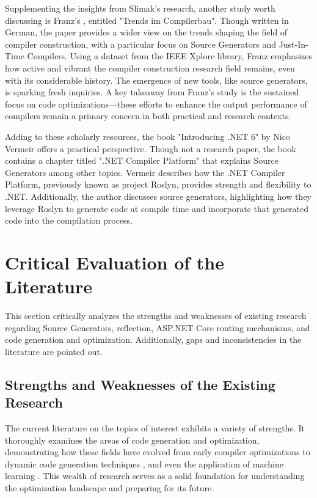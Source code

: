 Supplementing the insights from Slimak's research, another study worth discussing is Franz's \cite{Franz2022}, entitled "Trends im Compilerbau". Though written in German, the paper provides a wider view on the trends shaping the field of compiler construction, with a particular focus on Source Generators and Just-In-Time Compilers. Using a dataset from the IEEE Xplore library, Franz emphasizes how active and vibrant the compiler construction research field remains, even with its considerable history. The emergence of new tools, like source generators, is sparking fresh inquiries. A key takeaway from Franz's study is the sustained focus on code optimizations—these efforts to enhance the output performance of compilers remain a primary concern in both practical and research contexts.

Adding to these scholarly resources, the book "Introducing .NET 6" by Nico Vermeir \cite{Vermeir2022} offers a practical perspective. Though not a research paper, the book contains a chapter titled ".NET Compiler Platform" that explains Source Generators among other topics. Vermeir describes how the .NET Compiler Platform, previously known as project Roslyn, provides strength and flexibility to .NET. Additionally, the author discusses source generators, highlighting how they leverage Roslyn to generate code at compile time and incorporate that generated code into the compilation process.

\section{Critical Evaluation of the Literature}

This section critically analyzes the strengths and weaknesses of existing research regarding Source Generators, reflection, ASP.NET Core routing mechanisms, and code generation and optimization. Additionally, gaps and inconsistencies in the literature are pointed out.

\subsection{Strengths and Weaknesses of the Existing Research}

The current literature on the topics of interest exhibits a variety of strengths. It thoroughly examines the areas of code generation and optimization, demonstrating how these fields have evolved from early compiler optimizations \cite{Aho2007} to dynamic code generation techniques \cite{Kistler2003}, and even the application of machine learning \cite{Shreyas2021}. This wealth of research serves as a solid foundation for understanding the optimization landscape and preparing for its future.

